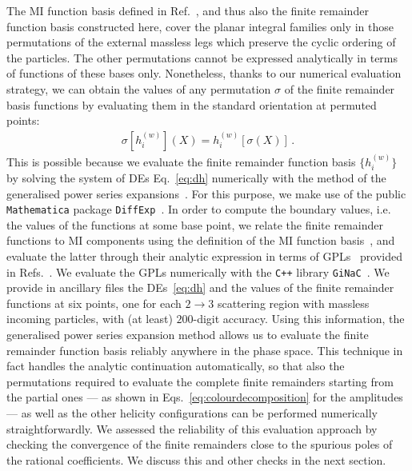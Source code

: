 \documentclass[main.tex]{subfiles}
\begin{document}
The MI function basis defined in Ref.~\cite{Badger:2021nhg}, and thus also the finite remainder function basis constructed here, cover the planar integral families only in those permutations of the external massless legs which preserve the cyclic ordering of the particles. The other permutations cannot be expressed analytically in terms of functions of these bases only. Nonetheless, thanks to our numerical evaluation strategy, we can obtain the values of any permutation $\sigma$ of the finite remainder basis functions by evaluating them in the standard orientation at permuted points:
\begin{align}
\sigma \left[ h^{(w)}_i \right] (X) =  h^{(w)}_i \left[\sigma\left(X\right)\right] \,.
\end{align}
This is possible because 
we evaluate the finite remainder function basis $\{h^{(w)}_i\}$ by solving the system of DEs Eq.~\ref{eq:dh} numerically with the method of the generalised power series expansions~\cite{Francesco:2019yqt}. For this purpose, we make use of the public \texttt{Mathematica} package \texttt{DiffExp}~\cite{Hidding:2020ytt}. In order to compute the boundary values, i.e. the values of the functions at some base point, we relate the finite remainder functions to MI components using the definition of the MI function basis~\cite{Badger:2021nhg}, and evaluate the latter through their analytic expression in terms of GPLs~\cite{2011arXiv1105.2076G,Remiddi:1999ew,2001math......3059G} provided in Refs.~\cite{Papadopoulos:2015jft,Syrrakos:2020kba,Canko:2020ylt}. We evaluate the GPLs numerically with the \texttt{C++} library \texttt{GiNaC}~\cite{Vollinga:2004sn}. We provide in ancillary files the DEs~\ref{eq:dh} and the values of the finite remainder functions at six points, one for each $2\to 3$ scattering region with massless incoming particles, with (at least) $200$-digit accuracy. Using this information, the generalised power series expansion method allows us to evaluate the finite remainder function basis reliably anywhere in the phase space. This technique in fact handles the analytic continuation automatically, so that also the permutations required to evaluate the complete finite remainders starting from the partial ones --- as shown in Eqs.~\ref{eq:colourdecomposition} for the amplitudes --- as well as the other helicity configurations can be performed numerically straightforwardly. We assessed the reliability of this evaluation approach by checking the convergence of the finite remainders close to the spurious poles of the rational coefficients. We discuss this and other checks in the next section.
\end{document}
